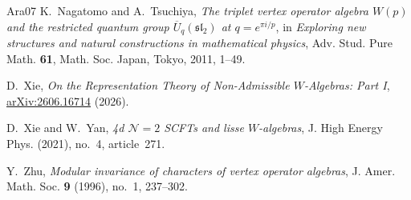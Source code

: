 \documentclass[11pt]{amsart}
\numberwithin{equation}{section}
\theoremstyle{definition}
\theoremstyle{remark}
\begin{document}
\begin{thebibliography}{Ara07}
K.~Nagatomo and A.~Tsuchiya,
\emph{The triplet vertex operator algebra $W(p)$ and the restricted
quantum group $\overline U_q(\mathfrak{sl}_2)$ at $q=e^{\pi i/p}$},
in \emph{Exploring new structures and natural constructions
in mathematical physics},
Adv. Stud. Pure Math. \textbf{61},
Math. Soc. Japan, Tokyo, 2011, 1--49.

D.~Xie,
\emph{On the Representation Theory of Non-Admissible
$W$-Algebras: Part I},
\href{https://arxiv.org/abs/2606.16714}{arXiv:2606.16714} (2026).

D.~Xie and W.~Yan,
\emph{4d $\mathcal N=2$ SCFTs and lisse $W$-algebras},
J. High Energy Phys. (2021), no.~4, article~271.

Y.~Zhu,
\emph{Modular invariance of characters of vertex operator algebras},
J. Amer. Math. Soc. \textbf{9} (1996), no.~1, 237--302.

\end{thebibliography}
\end{document}
